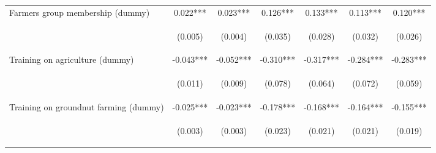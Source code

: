 \begin{center}
\begin{tabular}{lcccccc}
Farmers group membership (dummy) & 0.022*** & 0.023*** & 0.126*** & 0.133*** & 0.113*** & 0.120*** \\
\vspace{4pt} & \begin{footnotesize}(0.005)\end{footnotesize} & \begin{footnotesize}(0.004)\end{footnotesize} & \begin{footnotesize}(0.035)\end{footnotesize} & \begin{footnotesize}(0.028)\end{footnotesize} & \begin{footnotesize}(0.032)\end{footnotesize} & \begin{footnotesize}(0.026)\end{footnotesize} \\
Training on agriculture (dummy) & -0.043*** & -0.052*** & -0.310*** & -0.317*** & -0.284*** & -0.283*** \\
\vspace{4pt} & \begin{footnotesize}(0.011)\end{footnotesize} & \begin{footnotesize}(0.009)\end{footnotesize} & \begin{footnotesize}(0.078)\end{footnotesize} & \begin{footnotesize}(0.064)\end{footnotesize} & \begin{footnotesize}(0.072)\end{footnotesize} & \begin{footnotesize}(0.059)\end{footnotesize} \\
Training on groundnut farming (dummy) & -0.025*** & -0.023*** & -0.178*** & -0.168*** & -0.164*** & -0.155*** \\
\vspace{4pt} & \begin{footnotesize}(0.003)\end{footnotesize} & \begin{footnotesize}(0.003)\end{footnotesize} & \begin{footnotesize}(0.023)\end{footnotesize} & \begin{footnotesize}(0.021)\end{footnotesize} & \begin{footnotesize}(0.021)\end{footnotesize} & \begin{footnotesize}(0.019)\end{footnotesize} \\

\end{tabular}
\end{center}
